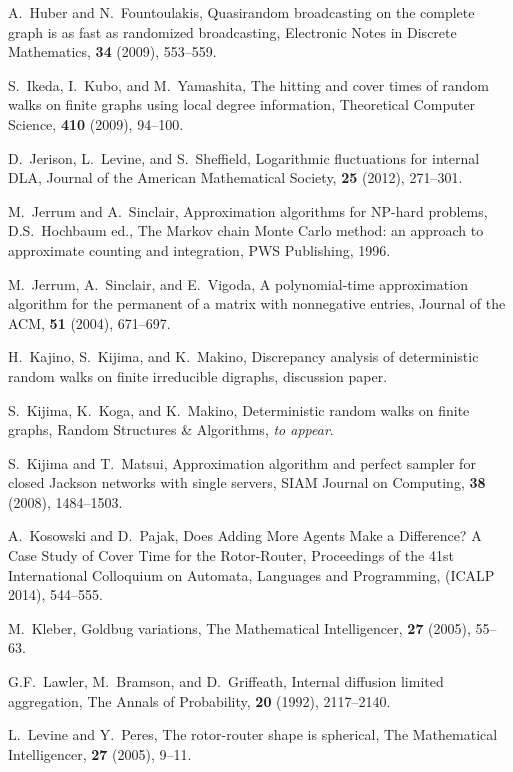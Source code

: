 \documentclass[letter, 11pt]{article}
\newcommand{\1}{\mbox{1}\hspace{-0.25em}\mbox{l}}
\begin{document}
\begin{thebibliography}{99}
 A.~Huber and N.~Fountoulakis, 
 Quasirandom broadcasting on the complete graph is as fast as randomized broadcasting, 
 Electronic Notes in Discrete Mathematics, {\bf 34} (2009), 553--559.

 S.~Ikeda, I.~Kubo, and M.~Yamashita, 
 The hitting and cover times of random walks on finite graphs using local degree information, 
 Theoretical Computer Science, {\bf 410} (2009), 94--100. 


 D.~Jerison, L.~Levine, and S.~Sheffield, 
 Logarithmic fluctuations for internal DLA, 
 Journal of the American Mathematical Society, {\bf 25} (2012), 271--301.

 M.~Jerrum and A.~Sinclair, 
 Approximation algorithms for NP-hard problems, 
 D.S.~Hochbaum ed., 
 The Markov chain Monte Carlo method: an approach to approximate counting and integration, 
 PWS Publishing, 1996. 

  M.~Jerrum, A.~Sinclair, and E.~Vigoda, 
 A polynomial-time approximation algorithm for the permanent of a matrix with nonnegative entries, 
 Journal of the ACM, {\bf 51} (2004), 671--697. 

 H.~Kajino, S.~Kijima, and K.~Makino, 
 Discrepancy analysis of deterministic random walks on finite irreducible digraphs, 
 discussion paper. 

 S.~Kijima, K.~Koga, and K.~Makino, 
 Deterministic random walks on finite graphs, 
 Random Structures \& Algorithms, {\em to appear}.

 S.~Kijima and T.~Matsui, 
 Approximation algorithm and perfect sampler for closed Jackson networks with single servers, 
 SIAM Journal on Computing, {\bf 38} (2008), 1484--1503. 
 
A.~Kosowski and D.~Pajak, 
Does Adding More Agents Make a Difference? A Case Study of Cover Time for the Rotor-Router,
Proceedings of the 41st International Colloquium on Automata, Languages and Programming, 
(ICALP 2014), 544--555.

 M.~Kleber, 
 Goldbug variations, 
 The Mathematical Intelligencer, {\bf 27} (2005), 55--63.

 G.F.~Lawler, M.~Bramson, and D.~Griffeath, 
 Internal diffusion limited aggregation, 
 The Annals of Probability, {\bf 20} (1992), 2117--2140.

 L.~Levine and Y.~Peres, 
 The rotor-router shape is spherical, 
 The Mathematical Intelligencer, {\bf 27} (2005), 9--11.


\end{thebibliography}
\end{document}
